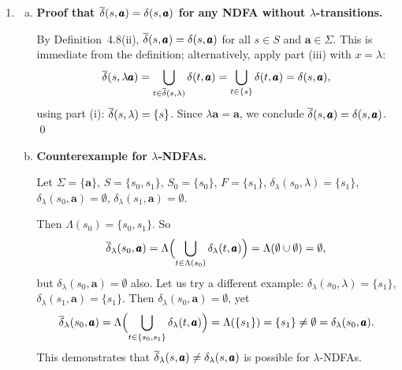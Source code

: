 \begin{enumerate}[{4.}1.]
\begin{enumerate}[(a)]
  \item \emph{Convert to $A^{\sigma d}_\lambda$ (connected portion only).}
  In Example~4.15, the start states of $A^{\sigma}_\lambda$ are
  \[
  \{q_0,s_0\},
  \]
  and the final states are $q_0$ and $s_2$.  The connected part of the
  deterministic equivalent has the reachable states
  \[
  R_0=\{q_0,s_0\},\quad
  R_1=\{s_1,s_2\},\quad
  R_2=\{s_3\},\quad
  R_3=\{s_2\},\quad
  R_4=\emptyset.
  \]
  Their transitions are
  \[
  \begin{array}{c|cccc}
   & \pmb{a} & \pmb{b} & \pmb{c} & \pmb{d}\\\hline
  R_0 & R_1 & R_2 & R_3 & R_3\\
  R_1 & R_4 & R_2 & R_3 & R_3\\
  R_2 & R_4 & R_1 & R_4 & R_4\\
  R_3 & R_4 & R_4 & R_4 & R_3\\
  R_4 & R_4 & R_4 & R_4 & R_4
  \end{array}
  \]
  The final states are
  \[
  R_0,\ R_1,\ R_3,
  \]
  because these are exactly the reachable subsets containing $q_0$ or $s_2$.
\end{enumerate}

\item \begin{enumerate}[(a)]
  \item \textbf{Proof that $\overline{\delta}(s,\pmb{a})=\delta(s,\pmb{a})$ for any NDFA
  without $\lambda$-transitions.}

  By Definition~4.8(ii), $\overline{\delta}(s,\pmb{a})=\delta(s,\pmb{a})$ for all
  $s\in S$ and $\pmb{a}\in\Sigma$.  This is immediate from the definition;
  alternatively, apply part (iii) with $x=\lambda$:
  \[
    \overline{\delta}(s,\lambda\pmb{a})
    =\bigcup_{t\in\overline{\delta}(s,\lambda)}\delta(t,\pmb{a})
    =\bigcup_{t\in\{s\}}\delta(t,\pmb{a})
    =\delta(s,\pmb{a}),
  \]
  using part (i): $\overline{\delta}(s,\lambda)=\{s\}$.  Since $\lambda\pmb{a}=\pmb{a}$,
  we conclude $\overline{\delta}(s,\pmb{a})=\delta(s,\pmb{a})$. \qed

  \item \textbf{Counterexample for $\lambda$-NDFAs.}

  Let $\Sigma=\{\pmb{a}\}$, $S=\{s_0,s_1\}$, $S_0=\{s_0\}$, $F=\{s_1\}$,
  $\delta_\lambda(s_0,\lambda)=\{s_1\}$, $\delta_\lambda(s_0,\pmb{a})=\emptyset$,
  $\delta_\lambda(s_1,\pmb{a})=\emptyset$.

  Then $\Lambda(s_0)=\{s_0,s_1\}$.  So
  \[
    \overline{\delta}_\lambda(s_0,\pmb{a})
    =\Lambda \Bigl(\bigcup_{t\in\Lambda(s_0)}\delta_\lambda(t,\pmb{a})\Bigr)
    =\Lambda(\emptyset\cup\emptyset)=\emptyset,
  \]
  but $\delta_\lambda(s_0,\pmb{a})=\emptyset$ also.  Let us try a different
  example: $\delta_\lambda(s_0,\lambda)=\{s_1\}$, $\delta_\lambda(s_1,\pmb{a})=\{s_1\}$.
  Then $\delta_\lambda(s_0,\pmb{a})=\emptyset$, yet
  \[
    \overline{\delta}_\lambda(s_0,\pmb{a})
    =\Lambda \Bigl(\bigcup_{t\in\{s_0,s_1\}}\delta_\lambda(t,\pmb{a})\Bigr)
    =\Lambda(\{s_1\})=\{s_1\}\neq\emptyset=\delta_\lambda(s_0,\pmb{a}).
  \]
  This demonstrates that $\overline{\delta}_\lambda(s,\pmb{a})\neq\delta_\lambda(s,\pmb{a})$
  is possible for $\lambda$-NDFAs.
\end{enumerate}


\end{enumerate}
